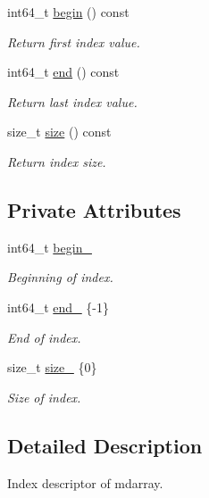 \begin{DoxyCompactItemize}
int64\+\_\+t \hyperlink{classsddk_1_1mdarray__index__descriptor_a8dd94b15133909dc7f7ff5ee7733a1e9}{begin} () const 
\begin{DoxyCompactList}\small\item\em Return first index value. \end{DoxyCompactList}\item 
int64\+\_\+t \hyperlink{classsddk_1_1mdarray__index__descriptor_a6ee955776e846d2620b597a032a03207}{end} () const 
\begin{DoxyCompactList}\small\item\em Return last index value. \end{DoxyCompactList}\item 
size\+\_\+t \hyperlink{classsddk_1_1mdarray__index__descriptor_a7c87699d4faa767df69c896d0cadbc7d}{size} () const 
\begin{DoxyCompactList}\small\item\em Return index size. \end{DoxyCompactList}\end{DoxyCompactItemize}
\subsection*{Private Attributes}
\begin{DoxyCompactItemize}
\item 
int64\+\_\+t \hyperlink{classsddk_1_1mdarray__index__descriptor_a2e27f4bf82a129939aafad05a697d047}{begin\+\_\+}
\begin{DoxyCompactList}\small\item\em Beginning of index. \end{DoxyCompactList}\item 
int64\+\_\+t \hyperlink{classsddk_1_1mdarray__index__descriptor_ad8579727937db1f90ac0b7a4ec820ed2}{end\+\_\+} \{-\/1\}
\begin{DoxyCompactList}\small\item\em End of index. \end{DoxyCompactList}\item 
size\+\_\+t \hyperlink{classsddk_1_1mdarray__index__descriptor_a725ee21beb6f1a31b735afc14316ad99}{size\+\_\+} \{0\}
\begin{DoxyCompactList}\small\item\em Size of index. \end{DoxyCompactList}\end{DoxyCompactItemize}


\subsection{Detailed Description}
Index descriptor of mdarray. 

